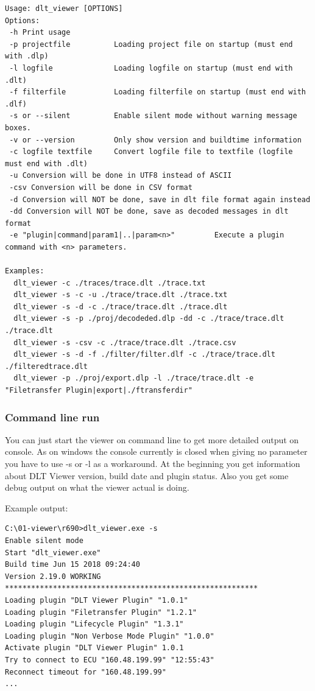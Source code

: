 \documentclass[a4paper,11pt]{article}
\begin{document}
\footnotesize\begin{verbatim}
Usage: dlt_viewer [OPTIONS]
Options:
 -h Print usage
 -p projectfile          Loading project file on startup (must end with .dlp)
 -l logfile              Loading logfile on startup (must end with .dlt)
 -f filterfile           Loading filterfile on startup (must end with .dlf)
 -s or --silent          Enable silent mode without warning message boxes.
 -v or --version         Only show version and buildtime information
 -c logfile textfile     Convert logfile file to textfile (logfile must end with .dlt)
 -u Conversion will be done in UTF8 instead of ASCII
 -csv Conversion will be done in CSV format
 -d Conversion will NOT be done, save in dlt file format again instead
 -dd Conversion will NOT be done, save as decoded messages in dlt format
 -e "plugin|command|param1|..|param<n>"         Execute a plugin command with <n> parameters.

Examples:
  dlt_viewer -c ./traces/trace.dlt ./trace.txt
  dlt_viewer -s -c -u ./trace/trace.dlt ./trace.txt
  dlt_viewer -s -d -c ./trace/trace.dlt ./trace.dlt
  dlt_viewer -s -p ./proj/decodeded.dlp -dd -c ./trace/trace.dlt ./trace.dlt
  dlt_viewer -s -csv -c ./trace/trace.dlt ./trace.csv
  dlt_viewer -s -d -f ./filter/filter.dlf -c ./trace/trace.dlt ./filteredtrace.dlt
  dlt_viewer -p ./proj/export.dlp -l ./trace/trace.dlt -e "Filetransfer Plugin|export|./ftransferdir"
\end{verbatim}
\normalsize

\subsubsection{Command line run}
You can just start the viewer on command line to get more detailed output on console.
As on windows the console currently is closed when giving no parameter you have to use -s or
-l as a workaround. At the beginning you get information about DLT Viewer version, build date and plugin status.
Also you get some debug output on what the viewer actual is doing.

Example output:

\begin{verbatim}
C:\01-viewer\r690>dlt_viewer.exe -s
Enable silent mode
Start "dlt_viewer.exe"
Build time Jun 15 2018 09:24:40
Version 2.19.0 WORKING
**********************************************************
Loading plugin "DLT Viewer Plugin" "1.0.1"
Loading plugin "Filetransfer Plugin" "1.2.1"
Loading plugin "Lifecycle Plugin" "1.3.1"
Loading plugin "Non Verbose Mode Plugin" "1.0.0"
Activate plugin "DLT Viewer Plugin" 1.0.1
Try to connect to ECU "160.48.199.99" "12:55:43"
Reconnect timeout for "160.48.199.99"
...
\end{verbatim}
\end{document}
